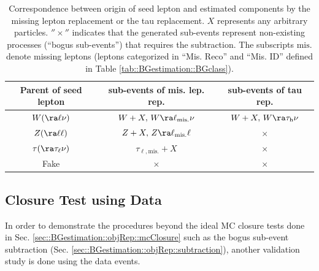 \begin{table}[h]
  \begin{center}
    \caption{Correspondence between origin of seed lepton and estimated components by the missing lepton replacement or the tau replacement. $X$ represents any arbitrary particles. $''\times''$ indicates that the generated sub-events represent non-existing processes (``bogus sub-events'') that requires the subtraction. The subscripts ${\mathrm{mis.}}$ denote missing leptons (leptons categorized in ``Mis. Reco'' and ``Mis. ID'' defined in Table \ref{tab::BGestimation::BGclass}).
}

    \begin{tabular}{  c | c | c  }
      \hline 
      Parent of seed lepton &   sub-events of mis. lep. rep.  &  sub-events of tau rep.  \\
%
      \hline 
      \hline      
      $W (\ra\ell\nu)$ &       $W+X, \, W\ra \ell_{\mathrm{mis.}}\nu$       &      $W+X, \, W\ra\tau_{\mathrm{h}} \nu$ \\
      \hline
      $Z (\ra\ell\ell)$ &       $Z+X, \, Z\ra \ell_{\mathrm{mis.}}\ell$     &      $\times$ \\
      \hline
      $\tau (\ra \tau_\ell \nu)$ &              $\tau_{\ell,{\mathrm{mis.}}}+X$             &      $\times$ \\
      \hline
      Fake &       $\times$       &      $\times$ \\
      \hline
    \end{tabular}  \label{tab::BGestimation::objRep::relProc}
  \end{center}
\end{table}








\clearpage
\subsection{Closure Test using Data} \label{sec::BGestimation::objRep::dataClosure}
In order to demonstrate the procedures beyond the ideal MC closure tests done in Sec. \ref{sec::BGestimation::objRep::mcClosure} such as the bogus sub-event subtraction (Sec. \ref{sec::BGestimation::objRep::subtraction}),
another validation study is done using the data events.


